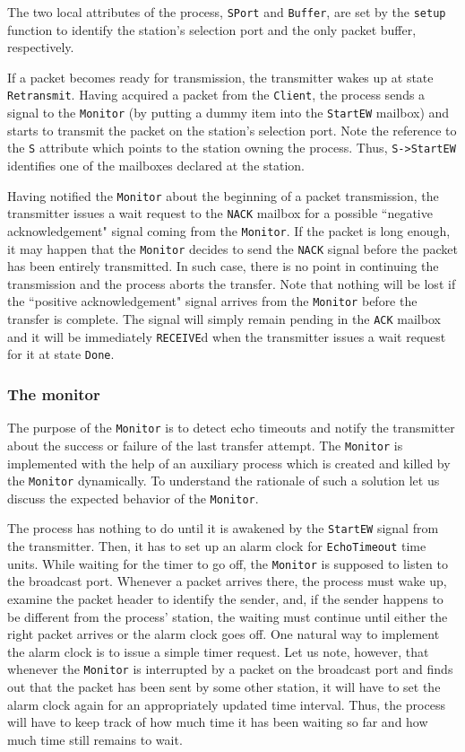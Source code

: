 The two local attributes of the process, {\tt SPort} and {\tt Buffer}, are set
by the {\tt setup} function to identify the station's selection port
and the only packet buffer, respectively.

If a packet becomes ready for transmission, the transmitter wakes up at
state {\tt Retransmit}.
Having acquired a packet from the {\tt Client}, the process sends a signal to the
{\tt Monitor} (by putting a dummy item into the {\tt StartEW} mailbox)
and starts to transmit the packet on the station's selection port.
Note the reference to the {\tt S} attribute which
points to the station owning the process.
Thus, {\tt S->StartEW} identifies one of the mailboxes declared at the station.

Having notified the {\tt Monitor} about the beginning of a packet transmission,
the transmitter issues a wait request to the {\tt NACK}
mailbox for a possible ``negative acknowledgement" signal coming from the
{\tt Monitor}.
If the packet is long enough, it may happen that the
{\tt Monitor} decides to send the {\tt NACK} signal before the
packet has been entirely transmitted.
In such case, there is no point in continuing the transmission and the
process aborts the transfer.
Note that nothing will be lost if the ``positive acknowledgement"
signal arrives from the {\tt Monitor} before the transfer is complete.
The signal will simply remain pending in the {\tt ACK} mailbox
and it will be immediately {\tt RECEIVE}d when the
transmitter issues a wait request for it at state {\tt Done}.

\subsubsection{The monitor}

The purpose of the {\tt Monitor} is to detect echo timeouts and notify the
transmitter about the success or failure of the last transfer attempt.
The {\tt Monitor} is implemented with the help of an auxiliary process which
is created and killed by the {\tt Monitor} dynamically.
To understand the rationale of such a solution let us discuss the
expected behavior of the {\tt Monitor}.

The process has nothing to do until it is awakened by the
{\tt StartEW} signal from the transmitter.
Then, it has to set up an alarm clock for {\tt EchoTimeout} time units.
While waiting for the timer to go off, the {\tt Monitor} is supposed to
listen to the broadcast port.
Whenever a packet arrives there, the process must wake up, examine
the packet header to identify the sender, and, if the sender happens to
be different from the process' station, the waiting must continue until
either the right packet arrives or the alarm clock goes off.
One natural way to implement the alarm clock is to issue a
simple timer request.
Let us note, however, that whenever the {\tt Monitor} is interrupted by a
packet
on the broadcast port and finds out that the packet has been sent
by some other station, it
will have to set the alarm clock again for an appropriately updated time
interval.
Thus, the process will have to keep track of how much time it has been
waiting so far and how much time still remains to wait.

